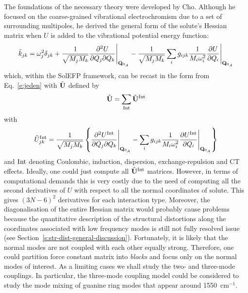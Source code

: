 \documentclass[b5paper,oneside,fleqn,11pt]{book}
\newcommand{\fderiv}[2]{\ensuremath{
    \frac{\partial #1}{\partial #2}}}
\newcommand{\sderivd}[3]{\ensuremath{
    \frac{\partial^2 #1}{\partial #2 \partial #3}
    }}
\begin{document}
\begin{refsection}
The foundations of the necessary theory were developed
by Cho. \citep{Cho.JCP.2009} Although he focused on the coarse\hyp{}grained
vibrational electrochromism due to a set of surrounding
multipoles, he derived the general form of the solute's
Hessian matrix when $U$ is added to the vibrational potential
energy function:
%
\begin{equation} 
 \tilde{k}_{jk} = \omega_j^2 \delta_{jk} + \frac{1}{\sqrt{M_jM_k}}\sderivd{U}{Q_j}{Q_k}  \Bigg|_{{\bf Q}_{0_A}} 
                           - \frac{1}{\sqrt{M_jM_k}}\sum_i g_{ijk} 
                             \frac{1}{M_i\omega_i^2}\fderiv{U}{Q_i}          \Bigg|_{{\bf Q}_{0_A}}        
\end{equation}
%
which, within the SolEFP framework, can be recast in
the form from Eq.~\eqref{e:jeden} with $\tilde{\bf U}$
defined by
%
\begin{equation} \label{e:dwa}
 \tilde{\bf U} = \sum_{\rm Int} \tilde{\bf U}^{\rm Int}
\end{equation}
%
with
%
\begin{equation}  \label{e:trzy}
 \tilde{U}^{\rm Int}_{jk} = \frac{1}{\sqrt{M_jM_k}} \left\{
            \sderivd{U^{\rm Int}}{Q_j}{Q_k}  \Bigg|_{{\bf Q}_{0_A}} 
           - \sum_i g_{ijk} \frac{1}{M_i\omega_i^2}\fderiv{U^{\rm Int}}{Q_i} \Bigg|_{{\bf Q}_{0_A}} 
           \right\}
\end{equation}
%
and $\rm Int$ denoting Coulombic, induction, dispersion, exchange\hyp{}repulsion
and CT effects. 
Ideally, one could just compute all
$\tilde{\bf U}^{\rm Int}$ matrices. However, in terms of
computational demands this is very costly due to the
need of computing all the second derivatives of $U$
with respect to all the normal coordinates of solute.
This gives $(3N-6)^2$ derivatives for each interaction
type. Moreover, the diagonalisation of the entire Hessian
matrix would probably cause problems because the quantitative
description of the structural distortions
along the coordinates associated with low frequency modes
is still not fully resolved issue (see Section~\ref{s:str-dist-general-discussion}). 
Fortunately, it is likely that the normal modes
are not coupled with each other equally strong. Therefore,
one could partition force constant matrix into \emph{blocks}
and focus only on the normal modes of interest. As a limiting
cases we shall study the two\hyp{} and three\hyp{}mode
couplings. 
In particular, the three\hyp{}mode coupling model 
could be considered to study the mode mixing of
guanine ring modes that appear around 1550~cm$^{-1}$.


\end{refsection}
\end{document}
